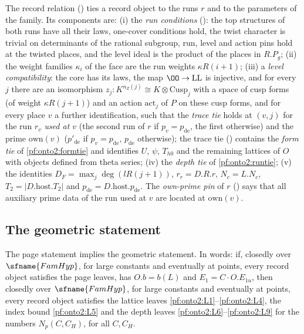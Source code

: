 \begin{remark}\label{pf:onto2:isrec}
The record relation () ties a record object to the runs $r$ and to the parameters of the
family. Its components are: (i) the \emph{run conditions} (): the top structures of both
runs have all their laws, one-cover conditions hold, the twist character is trivial on determinants of the rational subgroup,
run, level and action pins hold at the twisted places, and the level ideal is the product of the places in $R.P_g$; (ii) the
weight families $\kappa_i$ of the face are the run weights $\kappa R(i+1)$; (iii) a \emph{level compatibility}: the core has
its laws, the map $\OO\to\mathrm{LL}$ is injective, and for every $j$ there are an isomorphism $z_j:K^{n_Z(j)}\cong
K\otimes\mathrm{Cusp}_j$ with a space of cusp forms (of weight $\kappa R(j+1)$) and an action $\mathrm{act}_j$ of $P$ on these
cusp forms, and for every place $v$ a further identification, such that the \emph{trace tie} holds at $(v,j)$ for the run
$r_v$ \emph{used at $v$} (the second run of $r$ if $p_v=p_{\mathrm{de}}$, the first otherwise) and the prime $\mathrm{own}(v)$
($p'_{\mathrm{de}}$ if $p_v=p_{\mathrm{de}}$, $p_{\mathrm{de}}$ otherwise); the trace tie ()
contains the \emph{form tie} of \cref{pf:onto2:formtie} and identifies $U$, $\psi$, $T_{h0}$ and the remaining lattices of $O$
with objects defined from theta series; (iv) the \emph{depth tie} of \cref{pf:onto2:runtie}; (v) the identities
$D_F=\max_j\deg(lR(j+1))$, $r_r=D.R.r$, $N_c=L.N_c$, $T_2=|D.\mathrm{host}.T_2|$ and $p_{\mathrm{de}}=D.\mathrm{host}.p_{\mathrm{de}}$.
The \emph{own-prime pin} of $r$ () says that all auxiliary prime data of the run used at
$v$ are located at $\mathrm{own}(v)$.
\end{remark}
\subsection{The geometric statement}\label{sec:pf:onto2:geo}

\begin{theorem}\label{pf:onto2:thmA}
The page statement implies the geometric statement. In words: if, closedly over $\sfname{FamHyp}$, for large constants and
eventually at points, every record object satisfies the page leaves, has $O.b=b(L)$ and $E_1=C\cdot O.E_{1u}$, then
closedly over $\sfname{FamHyp}$, for large constants and eventually at points, every record object satisfies the lattice leaves
\ref{pf:onto2:L1}--\ref{pf:onto2:L4}, the index bound \ref{pf:onto2:L5} and the depth leaves \ref{pf:onto2:L6}--\ref{pf:onto2:L9}
for the numbers $N_p(C,C_H)$, for all $C,C_H$.
\end{theorem}

